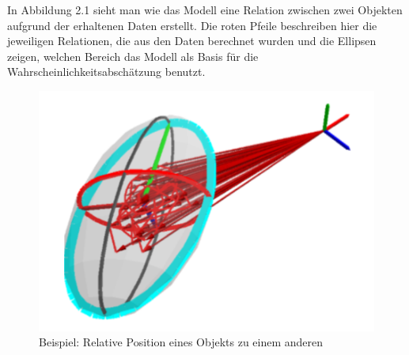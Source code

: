 In Abbildung 2.1 sieht man wie das Modell eine Relation zwischen zwei Objekten aufgrund der erhaltenen Daten erstellt. Die roten Pfeile beschreiben hier die jeweiligen Relationen, die aus den Daten berechnet wurden und die Ellipsen zeigen, welchen Bereich das Modell als Basis für die Wahrscheinlichkeitsabschätzung benutzt.
\begin{deprecated}
\cite{gehrung14}
\end{deprecated}

\begin{figure}
	\centering
	\includegraphics[width=15cm]{bilder/relation.pdf}
	\caption{Beispiel: Relative Position eines Objekts zu einem anderen}
	\label{img:relation}
\end{figure}

